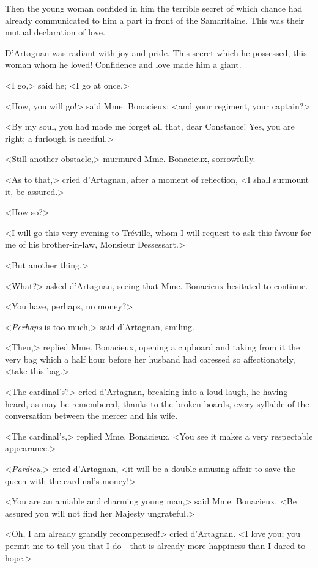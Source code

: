 Then the young woman confided in him the terrible secret of which chance had already communicated to him a part in front of the Samaritaine. This was their mutual declaration of love. 

D'Artagnan was radiant with joy and pride. This secret which he possessed, this woman whom he loved! Confidence and love made him a giant. 

<I go,> said he; <I go at once.> 

<How, you will go!> said Mme. Bonacieux; <and your regiment, your captain?> 

<By my soul, you had made me forget all that, dear Constance! Yes, you are right; a furlough is needful.> 

<Still another obstacle,> murmured Mme. Bonacieux, sorrowfully. 

<As to that,> cried d'Artagnan, after a moment of reflection, <I shall surmount it, be assured.> 

<How so?> 

<I will go this very evening to Tréville, whom I will request to ask this favour for me of his brother-in-law, Monsieur Dessessart.> 

<But another thing.> 

<What?> asked d'Artagnan, seeing that Mme. Bonacieux hesitated to continue. 

<You have, perhaps, no money?> 

<\textit{Perhaps} is too much,> said d'Artagnan, smiling. 

<Then,> replied Mme. Bonacieux, opening a cupboard and taking from it the very bag which a half hour before her husband had caressed so affectionately, <take this bag.> 

<The cardinal's?> cried d'Artagnan, breaking into a loud laugh, he having heard, as may be remembered, thanks to the broken boards, every syllable of the conversation between the mercer and his wife. 

<The cardinal's,> replied Mme. Bonacieux. <You see it makes a very respectable appearance.> 

<\textit{Pardieu},> cried d'Artagnan, <it will be a double amusing affair to save the queen with the cardinal's money!> 

<You are an amiable and charming young man,> said Mme. Bonacieux. <Be assured you will not find her Majesty ungrateful.> 

<Oh, I am already grandly recompensed!> cried d'Artagnan. <I love you; you permit me to tell you that I do---that is already more happiness than I dared to hope.> 

